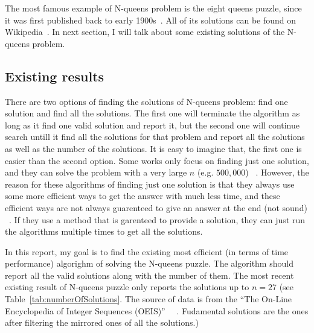 The most famous example of N-queens problem is the eight queens puzzle, since it was first published back to early 1900s~\cite{ball_mathematical_1914}. All of its solutions can be found on Wikipedia~\cite{noauthor_eight_2017}. In next section, I will talk about some existing solutions of the N-queens problem.

\subsection{Existing results}
There are two options of finding the solutions of N-queens problem: find one solution and find all the solutions. The first one will terminate the algorithm as long as it find one valid solution and report it,  but the second one will continue search untill it find all the solutions for that problem and report all the solutions as well as the number of the solutions. It is easy to imagine that, the first one is easier than the second option. Some works only focus on finding just one solution, and they can solve the problem with a very large  $n$ (e.g. $500,000$) ~\cite{sosic_polynomial_1990}. However, the reason for these algorithms of finding just one solution is that they always use some more efficient ways to get the answer with much less time, and these efficient ways are not always guarenteed to give an answer at the end (not sound) ~\cite{sosic_polynomial_1990}. If they use a method that is garenteed to provide a solution, they can just run the algorithms multiple times to get all the solutions.

In this report, my goal is to find the existing most efficient (in terms of time performance) algorighm of solving the N-queens puzzle. The algorithm should report all the valid solutions along with the number of them. The most recent existing result of N-queens puzzle only reports the solutions up to $n=27$ (see Table~\ref{tab:numberOfSolutions}. The source of data is from the ``The On-Line Encyclopedia of Integer Sequences (OEIS)'' ~\cite{noauthor_a002562_nodate}~\cite{noauthor_a000170_nodate}. Fudamental solutions are the ones after filtering the mirrored ones of all the solutions.)

